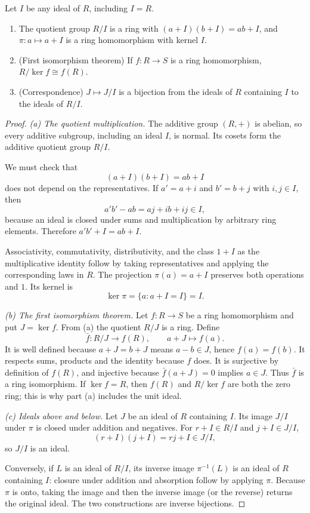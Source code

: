 \begin{proposition}\label{prop:quotring}
Let $I$ be any ideal of $R$, including $I=R$.
\begin{enumerate}[label=(\alph*)]
\item The quotient group $R/I$ is a ring with $(a+I)(b+I)=ab+I$, and $\pi:a\mapsto a+I$ is a ring homomorphism with kernel $I$.
\item (First isomorphism theorem) If $f:R\to S$ is a ring homomorphism, $R/\ker f\cong f(R)$.
\item (Correspondence) $J\mapsto J/I$ is a bijection from the ideals of $R$ containing $I$ to the ideals of $R/I$.
\end{enumerate}
\end{proposition}
\begin{proof}
\emph{(a) The quotient multiplication.}
The additive group $(R,+)$ is abelian,
so every additive subgroup, including
an ideal $I$, is normal. Its cosets
form the additive quotient group $R/I$.

We must check that
\[
(a+I)(b+I)=ab+I
\]
does not depend on the representatives.
If $a'=a+i$ and $b'=b+j$ with $i,j\in I$,
then
\[
a'b'-ab=aj+ib+ij\in I,
\]
because an ideal is closed under sums and
multiplication by arbitrary ring elements.
Therefore $a'b'+I=ab+I$.

Associativity, commutativity, distributivity,
and the class $1+I$ as the multiplicative
identity follow by taking representatives
and applying the corresponding laws in $R$.
The projection $\pi(a)=a+I$ preserves both
operations and $1$. Its kernel is
\[
\ker\pi=\{a:a+I=I\}=I.
\]

\emph{(b) The first isomorphism theorem.}
Let $f:R\to S$ be a ring homomorphism
and put $J=\ker f$. From (a) the
quotient $R/J$ is a ring. Define
\[
\bar f:R/J\to f(R),\qquad
a+J\longmapsto f(a).
\]
It is well defined because
$a+J=b+J$ means $a-b\in J$,
hence $f(a)=f(b)$. It respects sums,
products and the identity because $f$
does. It is surjective by definition
of $f(R)$, and injective because
$\bar f(a+J)=0$ implies $a\in J$.
Thus $\bar f$ is a ring isomorphism. If $\ker f=R$, then $f(R)$
and $R/\ker f$ are both the zero ring; this is why part (a) includes
the unit ideal.

\emph{(c) Ideals above and below.}
Let $J$ be an ideal of $R$ containing $I$.
Its image $J/I$ under $\pi$ is closed
under addition and negatives. For
$r+I\in R/I$ and $j+I\in J/I$,
\[
(r+I)(j+I)=rj+I\in J/I,
\]
so $J/I$ is an ideal.

Conversely, if $L$ is an ideal of $R/I$,
its inverse image $\pi^{-1}(L)$
is an ideal of $R$ containing $I$:
closure under addition and absorption
follow by applying $\pi$.
Because $\pi$ is onto, taking the image
and then the inverse image (or the reverse)
returns the original ideal. The two
constructions are inverse bijections.
\end{proof}

